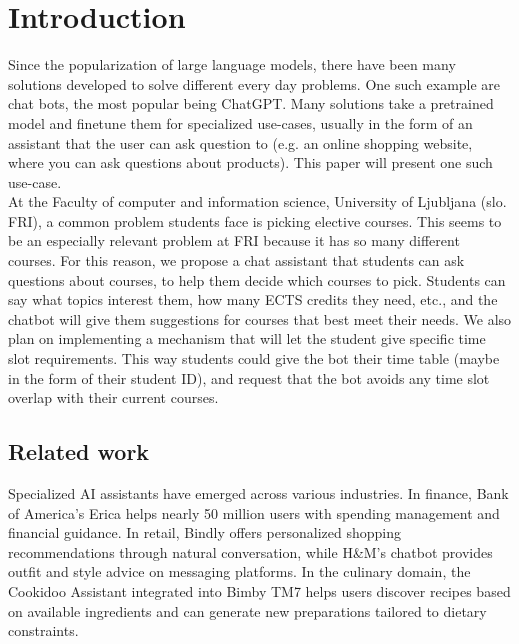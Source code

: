 \documentclass[fleqn,moreauthors,10pt]{ds_report}
\affiliation{\textit{Advisors: Slavko Žitnik}}
\begin{document}
\flushbottom 

\maketitle 

\thispagestyle{empty} 


\section*{Introduction}
    Since the popularization of large language models, there have been many solutions developed to solve different every day problems. One such example are chat bots, the most popular being ChatGPT. Many solutions take a pretrained model and finetune them for specialized use-cases, usually in the form of an assistant that the user can ask question to (e.g. an online shopping website, where you can ask questions about products). This paper will present one such use-case.\\

    At the Faculty of computer and information science, University of Ljubljana (slo. FRI), a common problem students face is picking elective courses. This seems to be an especially relevant problem at FRI because it has so many different courses. For this reason, we propose a chat assistant that students can ask questions about courses, to help them decide which courses to pick. Students can say what topics interest them, how many ECTS credits they need, etc., and the chatbot will give them suggestions for courses that best meet their needs. We also plan on implementing a mechanism that will let the student give specific time slot requirements. This way students could give the bot their time table (maybe in the form of their student ID), and request that the bot avoids any time slot overlap with their current courses.

\subsection*{Related work}

Specialized AI assistants have emerged across various industries. In finance, Bank of America's Erica helps nearly 50 million users with spending management and financial guidance. In retail, Bindly offers personalized shopping recommendations through natural conversation, while H\&M's chatbot provides outfit and style advice on messaging platforms. In the culinary domain, the Cookidoo Assistant integrated into Bimby TM7 helps users discover recipes based on available ingredients and can generate new preparations tailored to dietary constraints.
\end{document}
